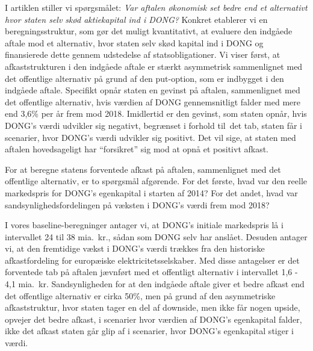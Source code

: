\documentclass{article}
\begin{document}
I artiklen stiller vi spørgsmålet: \emph{Var aftalen økonomisk set bedre end et alternativt hvor staten selv skød aktiekapital ind i DONG?} Konkret etablerer vi en beregningsstruktur, som gør det muligt kvantitativt, at evaluere den indgåede aftale mod et alternativ, hvor staten selv skød kapital ind i DONG og finansierede dette gennem udstedelse af statsobligationer. Vi viser først, at afkaststrukturen i den indgåede aftale er stærkt asymmetrisk sammenlignet med det offentlige alternativ på grund af den put-option, som er indbygget i den indgåede aftale. Specifikt opnår staten en gevinst på aftalen, sammenlignet med det offentlige alternativ, hvis værdien af DONG gennemsnitligt falder med mere end 3,6\% per år frem mod 2018. Imidlertid er den gevinst, som staten opnår, hvis DONG's værdi udvikler sig negativt, begrænset i forhold til\ det tab, staten får i scenarier, hvor DONG's værdi udvikler sig positivt. Det vil sige, at staten med aftalen hovedsageligt har \enquote{forsikret} sig mod at opnå et positivt afkast. 

For at beregne statens forventede afkast på aftalen, sammenlignet med det offentlige alternativ, er to spørgsmål afgørende. For det første, hvad var den reelle markedspris for DONG's egenkapital i starten af 2014? For det andet, hvad var sandsynlighedsfordelingen på væksten i DONG's værdi frem mod 2018? 

I vores baseline-beregninger antager vi, at DONG's initiale markedspris lå i intervallet 24 til 38 mia.\ kr., sådan som DONG selv har anslået. Desuden antager vi, at den fremtidige vækst i DONG's værdi trækkes fra den historiske afkastfordeling for europæiske elektricitetsselskaber. Med disse antagelser er det forventede tab på aftalen jævnført med et offentligt alternativ i intervallet 1,6 - 4,1 mia.\ kr. Sandsynligheden for at den indgåede aftale giver et bedre afkast end det offentlige alternativ er cirka 50\%, men på grund af den asymmetriske afkaststruktur, hvor staten tager en del af downside, men ikke får nogen upside, opvejer det bedre afkast, i scenarier hvor værdien af DONG's egenkapital falder, ikke det afkast staten går glip af i  scenarier, hvor DONG's egenkapital stiger i værdi.

\end{document}
